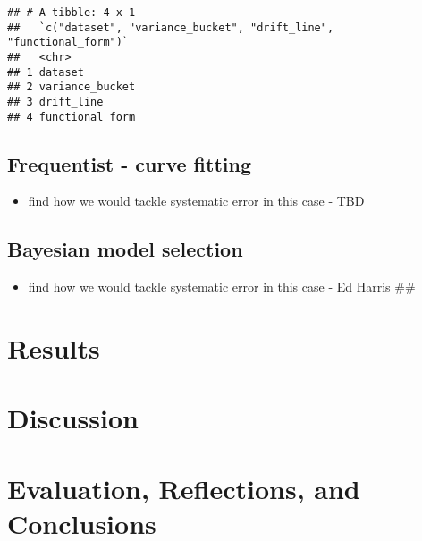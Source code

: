 \documentclass[]{article}
\providecommand{\tightlist}{%
  \setlength{\itemsep}{0pt}\setlength{\parskip}{0pt}}
\begin{document}
\begin{verbatim}
## # A tibble: 4 x 1
##   `c("dataset", "variance_bucket", "drift_line", "functional_form")`
##   <chr>                                                             
## 1 dataset                                                           
## 2 variance_bucket                                                   
## 3 drift_line                                                        
## 4 functional_form
\end{verbatim}

\hypertarget{frequentist---curve-fitting}{%
\subsection{Frequentist - curve
fitting}\label{frequentist---curve-fitting}}

\begin{itemize}
\tightlist
\item
  find how we would tackle systematic error in this case - TBD
\end{itemize}

\hypertarget{bayesian-model-selection}{%
\subsection{Bayesian model selection}\label{bayesian-model-selection}}

\begin{itemize}
\tightlist
\item
  find how we would tackle systematic error in this case - Ed Harris
  \#\#
\end{itemize}

\hypertarget{results}{%
\section{Results}\label{results}}

\hypertarget{discussion}{%
\section{Discussion}\label{discussion}}

\hypertarget{evaluation-reflections-and-conclusions}{%
\section{Evaluation, Reflections, and
Conclusions}\label{evaluation-reflections-and-conclusions}}
\end{document}

